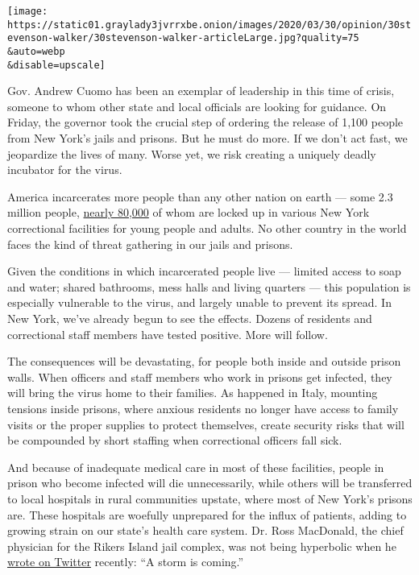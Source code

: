 \texttt{[image: https://static01.graylady3jvrrxbe.onion/images/2020/03/30/opinion/30stevenson-walker/30stevenson-walker-articleLarge.jpg?quality=75\\\&auto=webp\\\&disable=upscale]}

Gov. Andrew Cuomo has been an exemplar of leadership in this time of
crisis, someone to whom other state and local officials are looking for
guidance. On Friday, the governor took the crucial step of ordering the
release of 1,100 people from New York's jails and prisons. But he must
do more. If we don't act fast, we jeopardize the lives of many. Worse
yet, we risk creating a uniquely deadly incubator for the virus.

America incarcerates more people than any other nation on earth --- some
2.3 million people,
\href{https://www.prisonpolicy.org/profiles/NY.html}{nearly 80,000} of
whom are locked up in various New York correctional facilities for young
people and adults. No other country in the world faces the kind of
threat gathering in our jails and prisons.

Given the conditions in which incarcerated people live --- limited
access to soap and water; shared bathrooms, mess halls and living
quarters --- this population is especially vulnerable to the virus, and
largely unable to prevent its spread. In New York, we've already begun
to see the effects. Dozens of residents and correctional staff members
have tested positive. More will follow.

The consequences will be devastating, for people both inside and outside
prison walls. When officers and staff members who work in prisons get
infected, they will bring the virus home to their families. As happened
in Italy, mounting tensions inside prisons, where anxious residents no
longer have access to family visits or the proper supplies to protect
themselves, create security risks that will be compounded by short
staffing when correctional officers fall sick.

And because of inadequate medical care in most of these facilities,
people in prison who become infected will die unnecessarily, while
others will be transferred to local hospitals in rural communities
upstate, where most of New York's prisons are. These hospitals are
woefully unprepared for the influx of patients, adding to growing strain
on our state's health care system. Dr. Ross MacDonald, the chief
physician for the Rikers Island jail complex, was not being hyperbolic
when he
\href{https://twitter.com/RossMacDonaldMD/status/1240455800591732737}{wrote
on Twitter} recently: ``A storm is coming.''

